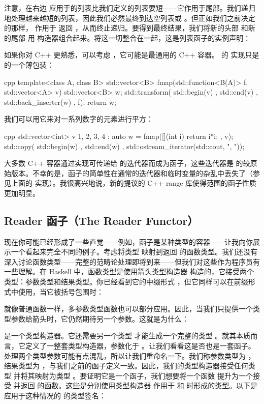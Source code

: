 注意，在右边  应用于的列表比我们定义的列表要短——它作用于尾部。我们递归地处理越来越短的列表，因此我们必然最终到达空列表或 。但正如我们之前决定的那样， 作用于  返回 ，从而终止递归。要得到最终结果，我们将新的头部  和新的尾部  用  构造器组合起来。将这一切整合在一起，这是列表函子的实例声明：

如果你对 C++ 更熟悉，可以考虑 ，它可能是最通用的 C++ 容器。 的  实现只是  的一个薄包装：

\begin{snip}{cpp}
  template<class A, class B>
  std::vector<B> fmap(std::function<B(A)> f, std::vector<A> v) {
    std::vector<B> w;
    std::transform( std::begin(v)
    , std::end(v)
    , std::back_inserter(w)
    , f);
    return w;
  }
\end{snip}
我们可以用它来对一系列数字的元素进行平方：

\begin{snip}{cpp}
  std::vector<int> v{ 1, 2, 3, 4 };
  auto w = fmap([](int i) { return i*i; }, v);
  std::copy( std::begin(w)
  , std::end(w)
  , std::ostream_iterator(std::cout, ", "));
\end{snip}
大多数 C++ 容器通过实现可传递给  的迭代器而成为函子，这些迭代器是  的较原始版本。不幸的是，函子的简单性在通常的迭代器和临时变量的杂乱中丢失了（参见上面的  实现）。我很高兴地说，新的提议的 C++ range 库使得范围的函子性质更加明显。

\subsection{Reader 函子（The Reader Functor）}

现在你可能已经形成了一些直觉——例如，函子是某种类型的容器——让我向你展示一个看起来完全不同的例子。考虑将类型  映射到返回  的函数类型。我们还没有深入讨论函数类型——完整的范畴论处理即将到来——但我们对这些作为程序员有一些理解。在 Haskell 中，函数类型是使用箭头类型构造器 \code{(->)} 构造的，它接受两个类型：参数类型和结果类型。你已经看到它的中缀形式 ，但它同样可以在前缀形式中使用，当它被括号包围时：

就像普通函数一样，多参数类型函数也可以部分应用。因此，当我们只提供一个类型参数给箭头时，它仍然期待另一个参数。这就是为什么：

是一个类型构造器。它还需要另一个类型  才能生成一个完整的类型 。就其本质而言，它定义了一整套类型构造器，参数化于 。让我们看看这是否也是一套函子。处理两个类型参数可能有点混乱，所以让我们重命名一下。我们称参数类型为 ，结果类型为 ，与我们之前的函子定义一致。因此，我们的类型构造器接受任何类型  并将其映射为类型 。要证明它是一个函子，我们想要将一个函数  提升为一个接受  并返回  的函数。这些是分别使用类型构造器  作用于  和  时形成的类型。以下是应用于这种情况的  的类型签名：

